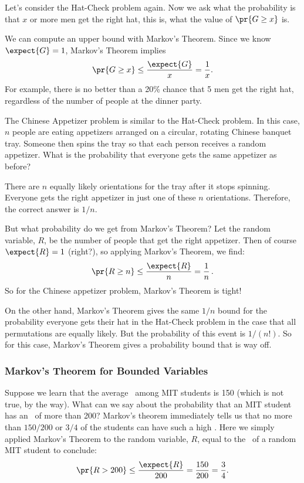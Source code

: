 Let's consider the Hat-Check problem again.  Now we ask what the
probability is that $x$ or more men get the right hat, this is, what the
value of $\pr{G \geq x}$ is.

We can compute an upper bound with Markov's Theorem.  Since we know
$\expect{G}=1$, Markov's Theorem implies
\[
\pr{G \geq x} \leq \frac{\expect{G}}{x} = \frac{1}{x}.
\]
For example, there is no better than a 20\% chance that 5 men get the
right hat, regardless of the number of people at the dinner party.

The Chinese Appetizer problem is similar to the Hat-Check problem.  In
this case, $n$ people are eating appetizers arranged on a circular,
rotating Chinese banquet tray.  Someone then spins the tray so that each
person receives a random appetizer.  What is the probability that everyone
gets the same appetizer as before?

There are $n$ equally likely orientations for the tray after it stops
spinning.  Everyone gets the right appetizer in just one of these $n$
orientations.  Therefore, the correct answer is $1/n$.

But what probability do we get from Markov's Theorem?  Let the random
variable, $R$, be the number of people that get the right appetizer.  
Then of course $\expect{R} = 1$ (right?), so
applying Markov's Theorem, we find:
\begin{displaymath}
  \pr{R \geq n} \leq \frac{\expect{R}}{n} = \frac{1}{n}\,.
\end{displaymath}
So for the Chinese appetizer problem, Markov's Theorem is tight!

On the other hand, Markov's Theorem gives the same $1/n$ bound for the
probability everyone gets their hat in the Hat-Check problem in the case
that all permutations are equally likely.  But the probability of this
event is $1/(n!)$.  So for this case, Markov's Theorem gives a probability
bound that is way off.

\subsubsection{Markov's Theorem for Bounded Variables}

Suppose we learn that the average \IQ\ among MIT students is 150 (which is
not true, by the way).  What can we say about the probability that an MIT
student has an \IQ\ of more than 200?  Markov's theorem immediately tells
us that no more than $150/200$ or $3/4$ of the students can have such a
high \IQ.  Here we simply applied Markov's Theorem to the random variable,
$R$, equal to the \IQ\ of a random MIT student to conclude:
\[
\pr{R > 200} \leq \frac{\expect{R}}{200}= \frac{150}{200} = \frac{3}{4}.
\]

